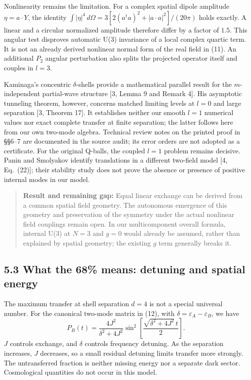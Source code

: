 \documentclass[a4paper,11pt]{article}
\begin{document}
Nonlinearity remains the limitation. For a complex spatial dipole amplitude $\eta=a\cdot Y$, the identity $\int|\eta|^4\,d\Omega=3[2(a^\dagger a)^2+|a\cdot a|^2]/(20\pi)$ holds exactly. A linear and a circular normalized amplitude therefore differ by a factor of $1.5$. This angular test disproves automatic U(3) invariance of a local complex quartic term. It is not an already derived nonlinear normal form of the real field in (11). An additional $P_2$ angular perturbation also splits the projected operator itself and couples in $l=3$.

Kaminaga's concentric $\delta$-shells provide a mathematical parallel result for the $m$-independent partial-wave structure [3, Lemma 9 and Remark 4]. His asymptotic tunneling theorem, however, concerns matched limiting levels at $l=0$ and large separation [3, Theorem 17]. It establishes neither our smooth $l=1$ numerical values nor exact complete transfer at finite separation; the latter follows here from our own two-mode algebra. Technical review notes on the printed proof in \S\S6--7 are documented in the source audit; its error orders are not adopted as a certificate. For the original Q-balls, the coupled $l=1$ problem remains decisive. Panin and Smolyakov identify translations in a different two-field model [4, Eq.~(22)]; their stability study does not prove the absence or presence of positive internal modes in our model.

\begin{quote}
\textbf{Result and remaining gap:} Equal linear exchange can be derived from a common spatial field geometry. The autonomous emergence of this geometry and preservation of the symmetry under the actual nonlinear field couplings remain open. In our multicomponent overall formula, internal U(3) at $N=3$ and $g=0$ would already be assumed, rather than explained by spatial geometry; the existing $g$ term generally breaks it.
\end{quote}

\subsection*{5.3 What the 68\% means: detuning and spatial energy}
The maximum transfer at shell separation $d=4$ is not a special universal number. For the canonical two-mode matrix in (12), with $\delta=\varepsilon_A-\varepsilon_B$, we have
\begin{equation}
P_B(t)=\frac{4J^2}{\delta^2+4J^2}\sin^2\left[\frac{\sqrt{\delta^2+4J^2}\,t}{2}\right].\tag{13}
\end{equation}
$J$ controls exchange, and $\delta$ controls frequency detuning. As the separation increases, $J$ decreases, so a small residual detuning limits transfer more strongly. The untransferred fraction is neither missing energy nor a separate dark sector. Cosmological quantities do not occur in this model.
\end{document}
